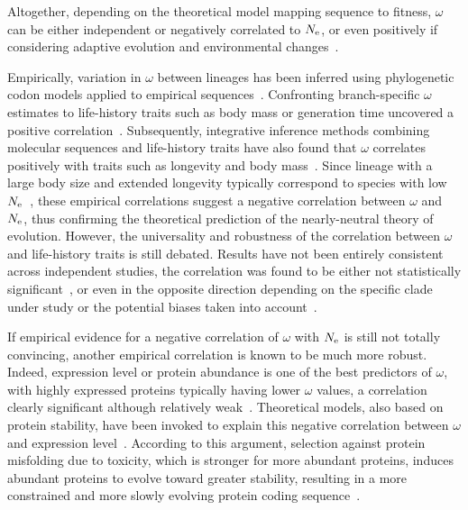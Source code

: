 Altogether, depending on the theoretical model mapping sequence to fitness, $\omega$ can be either independent or negatively correlated to $N_{\text{e}}$, or even positively if considering adaptive evolution and environmental changes~\citep{Lanfear2014}.

Empirically, variation in $\omega$ between lineages has been inferred using phylogenetic codon models applied to empirical sequences~\citep{Yang1998,Zhang2004}.
Confronting branch-specific $\omega$ estimates to life-history traits such as body mass or generation time uncovered a positive correlation~\citep{Popadin2007, Nikolaev2007}.
Subsequently, integrative inference methods combining molecular sequences and life-history traits have also found that $\omega$ correlates positively with traits such as longevity and body mass~\citep{Lartillot2011, Figuet2017}.
Since lineage with a large body size and extended longevity typically correspond to species with low $N_{\text{e}}$~\citep{Romiguier2014}, these empirical correlations suggest a negative correlation between $\omega$ and $N_{\text{e}}$, thus confirming the theoretical prediction of the nearly-neutral theory of evolution.
However, the universality and robustness of the correlation between $\omega$ and life-history traits is still debated.
Results have not been entirely consistent across independent studies, the correlation was found to be either not statistically significant~\citep{Lartillot2012}, or even in the opposite direction depending on the specific clade under study or the potential biases taken into account~\citep{Lanfear2010, Nabholz2013, Lanfear2014, Figuet2016}.

If empirical evidence for a negative correlation of $\omega$ with $N_{\text{e}}$ is still not totally convincing, another empirical correlation is known to be much more robust.
Indeed, expression level or protein abundance is one of the best predictors of $\omega$, with highly expressed proteins typically having lower $\omega$ values, a correlation clearly significant although relatively weak~\citep{Duret2000, Rocha2004, Drummond2005a, Zhang2015, Song2017}.
Theoretical models, also based on protein stability, have been invoked to explain this negative correlation between $\omega$ and expression level~\citep{Wilke2006, Drummond2008}.
According to this argument, selection against protein misfolding due to toxicity, which is stronger for more abundant proteins, induces abundant proteins to evolve toward greater stability, resulting in a more constrained and more slowly evolving protein coding sequence~\citep{Serohijos2012}.

